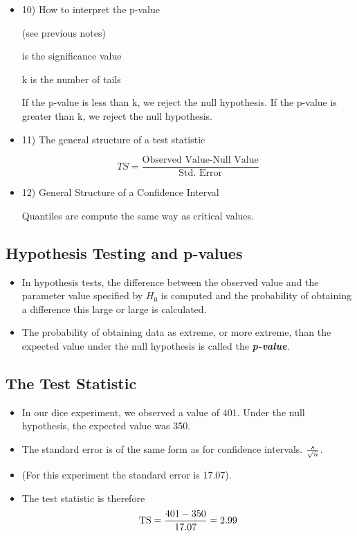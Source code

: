 \documentclass[]{report}
\begin{document}
{\begin{itemize}
\item10) How to interpret the p-value

(see previous notes)

is the significance value

k is the number of tails

If the p-value is less than k, we reject the null hypothesis.
If the p-value is greater than k, we reject the null hypothesis.

\item11) The general structure of a test statistic

\[TS =\frac{\mbox{Observed Value-Null Value}}{\mbox{Std. Error}} \]

\item 12) General Structure of a Confidence Interval




Quantiles are compute the same way as critical values.

\end{itemize}





\subsection{Hypothesis Testing and p-values}
\begin{itemize}
\item In hypothesis tests, the difference between the observed value and the parameter value specified by $H_0$ is computed and the probability of obtaining a difference this large or large is calculated.
\item The probability of obtaining data as extreme, or more extreme, than the expected value under the null hypothesis is called the \textbf{\emph{p-value}}.

\end{itemize}






\subsection{The Test Statistic}
\begin{itemize}

\item In our dice experiment, we observed a value of 401. Under the null hypothesis, the expected value was 350.
\item The standard error is of the same form as for confidence intervals. $s \over \sqrt{n}$.
\item (For this experiment the standard error is 17.07).
\item The test statistic is therefore \[ \mbox{TS}  = {401 - 350  \over 17.07} = 2.99 \]
\end{itemize}












}
\end{document}
